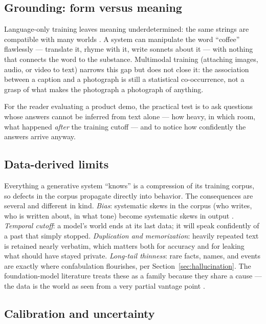 \documentclass[11pt,a4paper]{article}
\begin{document}
\subsection{Grounding: form versus meaning}
\label{sec:grounding}

Language-only training leaves meaning underdetermined: the same strings are
compatible with many worlds \autocite{bender2020climbing}. A system can
manipulate the word ``coffee'' flawlessly --- translate it, rhyme with it,
write sonnets about it --- with nothing that connects the word to the
substance. Multimodal training (attaching images, audio, or video to text)
narrows this gap but does not close it: the association between a caption and
a photograph is still a statistical co-occurrence, not a grasp of what makes
the photograph a photograph of anything.

For the reader evaluating a product demo, the practical test is to ask
questions whose answers cannot be inferred from text alone --- how heavy, in
which room, what happened \emph{after} the training cutoff --- and to notice
how confidently the answers arrive anyway.

\subsection{Data-derived limits}
\label{sec:data}

Everything a generative system ``knows'' is a compression of its training
corpus, so defects in the corpus propagate directly into behavior. The
consequences are several and different in kind. \emph{Bias}: systematic
skews in the corpus (who writes, who is written about, in what tone) become
systematic skews in output \autocite{weidinger2021ethical}.
\emph{Temporal cutoff}: a model's world ends at its last data; it will speak
confidently of a past that simply stopped. \emph{Duplication and memorization}:
heavily repeated text is retained nearly verbatim, which matters both for
accuracy and for leaking what should have stayed private.
\emph{Long-tail thinness}: rare facts, names, and events are exactly where
confabulation flourishes, per Section~\ref{sec:hallucination}. The
foundation-model literature treats these as a family because they share a
cause --- the data is the world as seen from a very partial vantage point
\autocite{bommasani2021opportunities}.

\subsection{Calibration and uncertainty}
\label{sec:calibration}
\end{document}
